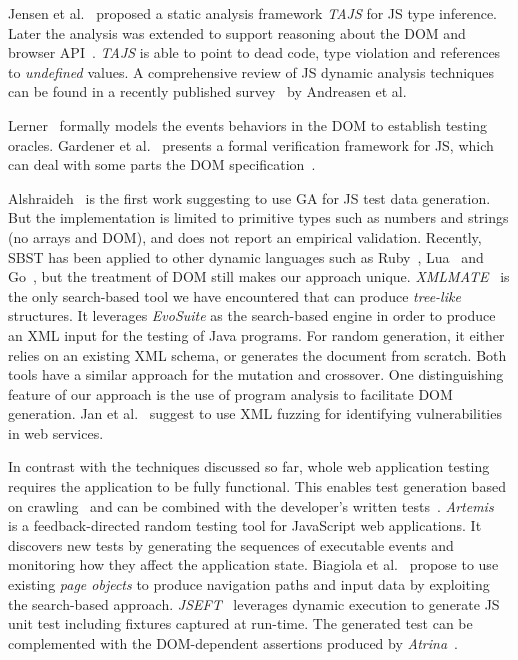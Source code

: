 
Jensen et al.~\cite{tajs2009} proposed a static analysis framework \emph{TAJS} for JS type inference. Later the analysis was extended to support reasoning about the DOM and browser API~\cite{dom2011}. \emph{TAJS} is able to point to dead code, type violation and references to \emph{undefined} values. A comprehensive review of JS dynamic analysis techniques can be found in a recently published survey~\cite{andreasen2017survey} by Andreasen et al.

Lerner~\cite{lerner2012modeling} formally models the events behaviors in the DOM to establish testing oracles. Gardener et al.~\cite{gardner2012towards} presents a formal verification framework for JS, which can deal with some parts the DOM specification~\cite{gardner2008local}.

Alshraideh~\cite{alshraideh2008complete} is the first work suggesting to use GA for JS test data generation. But the implementation is limited to primitive types such as numbers and strings (no arrays and DOM), and does not report an empirical validation. Recently, SBST has been applied to other dynamic languages such as Ruby~\cite{mairhofer2011search}, Lua~\cite{wibowo2015unit} and Go~\cite{irawan2016test}, but the treatment of DOM still makes our approach unique. \emph{XMLMATE}~\cite{havrikov2014xmlmate} is the only search-based tool we have encountered that can produce \emph{tree-like} structures. It leverages \emph{EvoSuite} as the search-based engine in order to produce an XML input for the testing of Java programs. For random generation, it either relies on an existing XML schema, or generates the document from scratch. Both tools have a similar approach for the mutation and crossover. One distinguishing feature of our approach is the use of program analysis to facilitate DOM generation. Jan et al.~\cite{jan2016automated} suggest to use XML fuzzing for identifying vulnerabilities in web services.

In contrast with the techniques discussed so far, whole web application testing requires the application to be fully functional. This enables test generation based on crawling~\cite{mesbah2012invariant} and can be combined with the developer's written tests~\cite{milani2014leveraging}. \emph{Artemis}~\cite{artemis2011} is a feedback-directed random testing tool for JavaScript web applications. It discovers new tests by generating the sequences of executable events and monitoring how they affect the application state. Biagiola et al.~\cite{biagiola2017search} propose to use existing \emph{page objects} to produce navigation paths and input data by exploiting the search-based approach. \emph{JSEFT}~\cite{mirshokraie2015jseft} leverages dynamic execution to generate JS unit test including fixtures captured at run-time. The generated test can be complemented with the DOM-dependent assertions produced by \emph{Atrina}~\cite{icst16}.

